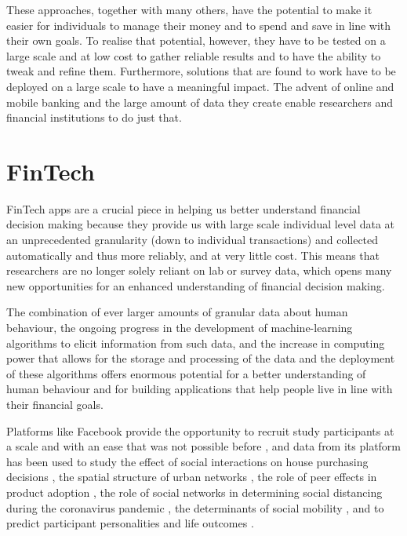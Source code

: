 These approaches, together with many others, have the potential to make it
easier for individuals to manage their money and to spend and save in line with
their own goals. To realise that potential, however, they have to be tested on
a large scale and at low cost to gather reliable results and to have the
ability to tweak and refine them. Furthermore, solutions that are found to work
have to be deployed on a large scale to have a meaningful impact. The advent of
online and mobile banking and the large amount of data they create enable
researchers and financial institutions to do just that.


\section{FinTech}%

{\color{blue} FinTech apps are a crucial piece in helping us better understand financial decision making because they provide us with large scale individual level data at an unprecedented granularity (down to individual transactions) and collected automatically and thus more reliably, and at very little cost. This means that researchers are no longer solely reliant on lab or survey data, which opens many new opportunities for an enhanced understanding of financial decision making.}

The combination of ever larger amounts of granular data about human behaviour, the ongoing progress in the development of machine-learning
algorithms to elicit information from such data, and the increase in computing power
that allows for the storage and processing of the data and the deployment of
these algorithms offers enormous potential for a better understanding of human
behaviour \citep{jaffe2014big, buyalskaya2021golden} and for building
applications that help people live in line with their financial goals.

Platforms like Facebook provide the opportunity to recruit study participants
at a scale and with an ease that was not possible before
\citep{kosinski2015facebook}, and data from its platform has been used to study the effect of social interactions on
house purchasing decisions \citep{bailey2018economic, bailey2019house}, the
spatial structure of urban networks \citep{bailey2020socialconnectedness}, the role of peer
effects in product adoption \citep{bailey2019peer}, the role of social networks
in determining social distancing during the coronavirus pandemic
\citep{bailey2020socialnetworks}, the determinants of social mobility
\citep{chetty2022sociali, chetty2022socialii}, and to predict participant personalities and life outcomes \citep{youyou2015computer}.

